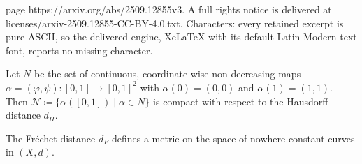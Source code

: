 \documentclass[10pt,a4paper]{amsart}
\begin{document}
page https://arxiv.org/abs/2509.12855v3. A full rights notice is delivered at licenses/arxiv-2509.12855-CC-BY-4.0.txt. Characters: every retained excerpt is pure ASCII, so the delivered engine, XeLaTeX with its default Latin Modern text font, reports no missing character.
\begin{Lemma}\label{Lem:parametrizations-Hausdorff-compact}
Let $N$ be the set of continuous, coordinate-wise non-decreasing maps $\alpha=(\varphi,\psi) \colon [0,1]\to [0,1]^2$ with $\alpha(0) = (0,0)$
and $\alpha(1)=(1,1)$. Then $\mathcal{N} \coloneqq \{\alpha([0,1]) \mid \alpha\in N\}$ is compact with respect to the Hausdorff distance $d_H$.
\end{Lemma}

\begin{Proposition}\label{Prop:Frechet-distance} The Fr\'echet distance $d_F$ defines a metric on the space of nowhere constant curves in $(X,d)$.  
\end{Proposition}
\end{document}
